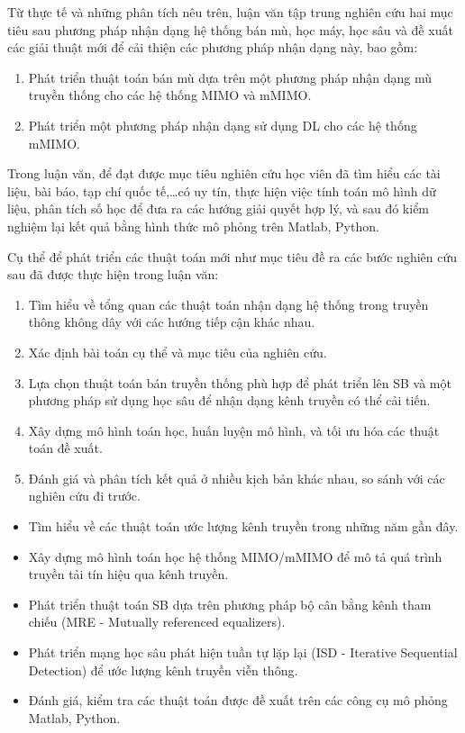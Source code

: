 Từ thực tế và những phân tích nêu trên, luận văn tập trung nghiên cứu hai mục tiêu sau phương pháp nhận dạng hệ thống bán mù, học máy, học sâu và đề xuất các giải thuật mới để cải thiện các phương pháp nhận dạng này, bao gồm:
\begin{enumerate}
    \item Phát triển thuật toán bán mù dựa trên một phương pháp nhận dạng mù truyền thống cho các hệ thống MIMO và mMIMO.
    
    \item Phát triển một phương pháp nhận dạng sử dụng DL cho các hệ thống mMIMO.
\end{enumerate}
\vspace{0.5cm}


Trong luận văn, để đạt được mục tiêu nghiên cứu học viên đã tìm hiểu các tài liệu, bài báo, tạp chí quốc tế,\ldots có uy tín, thực hiện việc tính toán mô hình dữ liệu, phân tích số học để đưa ra các hướng giải quyết hợp lý, và sau đó kiểm nghiệm lại kết quả bằng hình thức mô phỏng trên Matlab, Python.

Cụ thể để phát triển các thuật toán mới như mục tiêu đề ra các bước nghiên cứu sau đã được thực hiện trong luận văn:

\begin{enumerate}
    \item Tìm hiểu về tổng quan các thuật toán nhận dạng hệ thống trong truyền thông không dây với các hướng tiếp cận khác nhau. 
	\item Xác định bài toán cụ thể và mục tiêu của nghiên cứu.
	\item Lựa chọn thuật toán bán truyền thống phù hợp để phát triển lên SB và một phương pháp sử dụng học sâu để nhận dạng kênh truyền có thể cải tiến.
	\item Xây dựng mô hình toán học, huấn luyện mô hình, và tối ưu hóa các thuật toán đề xuất.
	\item Đánh giá và phân tích kết quả ở nhiều kịch bản khác nhau, so sánh với các nghiên cứu đi trước.
\end{enumerate} 
\vspace{0.3cm}


\renewcommand{\labelitemi}{$-$}
\begin{itemize}
	\item Tìm hiểu về các thuật toán ước lượng kênh truyền trong những năm gần đây.
	\item Xây dựng mô hình toán học hệ thống MIMO/mMIMO để mô tả quá trình truyền tải tín hiệu qua kênh truyền.
	\item Phát triển thuật toán SB dựa trên phương pháp bộ cân bằng kênh tham chiếu (MRE - Mutually referenced equalizers).
	\item Phát triển mạng học sâu phát hiện tuần tự lặp lại (ISD - Iterative Sequential Detection) để ước lượng kênh truyền viễn thông.
	\item Đánh giá, kiểm tra các thuật toán được đề xuất trên các công cụ mô phỏng Matlab, Python.
\end{itemize} 
\vspace{0.3cm}

